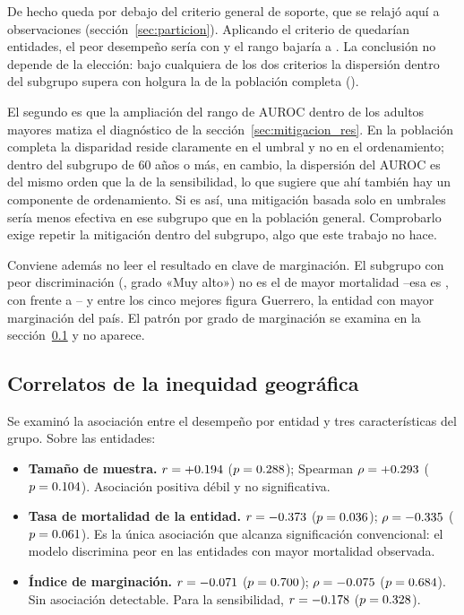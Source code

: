 De hecho \sesentaPeor{} queda por debajo del criterio general de soporte, que se
relajó aquí a \interMinN{} observaciones (sección~\ref{sec:particion}). Aplicando
el criterio de  quedarían \interNestandar{} entidades, el peor
desempeño sería \interPeorEstandar{} con \interPeorEstandarAUROC{} y el rango
bajaría a \interRangoEstandar. La conclusión no depende de la elección: bajo
cualquiera de los dos criterios la dispersión dentro del subgrupo supera con
holgura la de la población completa (\gapAUROCentidad).

El segundo es que la ampliación del rango de AUROC dentro de los adultos mayores
matiza el diagnóstico de la sección~\ref{sec:mitigacion_res}. En la población
completa la disparidad reside claramente en el umbral y no en el ordenamiento;
dentro del subgrupo de 60 años o más, en cambio, la dispersión del AUROC es del
mismo orden que la de la sensibilidad, lo que sugiere que ahí también hay un
componente de ordenamiento. Si es así, una mitigación basada solo en umbrales
sería menos efectiva en ese subgrupo que en la población general. Comprobarlo
exige repetir la mitigación dentro del subgrupo, algo que este trabajo no hace.

Conviene además no leer el resultado en clave de marginación. El subgrupo con
peor discriminación (\sesentaPeor, grado «Muy alto») no es el de mayor mortalidad
--esa es \sesentaMasLetal, con \sesentaMasLetalTasa{} frente a
\sesentaPeorTasa-- y entre los cinco mejores figura Guerrero, la entidad con
mayor marginación del país. El patrón por grado de marginación se examina en la
sección~\ref{sec:correlatos} y no aparece.

\subsection{Correlatos de la inequidad geográfica}
\label{sec:correlatos}

Se examinó la asociación entre el desempeño por entidad y tres características
del grupo. Sobre las \nEntidades{} entidades:

\begin{itemize}[leftmargin=*]
  \item \textbf{Tamaño de muestra.} $r=+0.194$ ($p=0.288$);
    Spearman $\rho=+0.293$ ($p=0.104$). Asociación positiva
    débil y no significativa.
  \item \textbf{Tasa de mortalidad de la entidad.} $r=-0.373$
    ($p=0.036$); $\rho=-0.335$ ($p=0.061$).
    Es la única asociación que alcanza significación convencional: el modelo
    discrimina peor en las entidades con mayor mortalidad observada.
  \item \textbf{Índice de marginación.} $r=-0.071$
    ($p=0.700$); $\rho=-0.075$ ($p=0.684$).
    Sin asociación detectable. Para la sensibilidad, $r=-0.178$
    ($p=0.328$).
\end{itemize}

